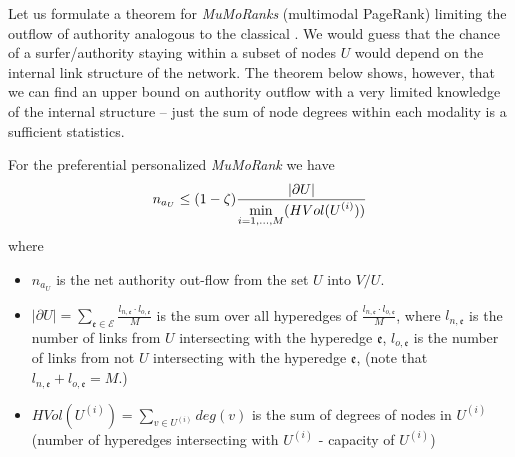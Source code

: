 \documentclass{fundam}
\newcommand{\HEM}{\mathcal{E}}
\newcommand{\hem}{\mathfrak{e}}
\newcommand{\N}{ V }
\begin{document}
Let us formulate a theorem for \emph{MuMoRanks} (multimodal  PageRank) limiting the outflow of authority analogous to the classical
\cite[Theorem 2]{Bipartite:2016}.
We would guess that the chance of a surfer/authority staying within a subset of nodes $U$ would depend on the internal link structure of the network. The theorem below shows, however, that we can find an upper bound on authority outflow with a very limited knowledge of the internal structure -- just the sum of node degrees within each modality is a sufficient statistics.

\begin{theorem} \label{thMPRlimit}
For the preferential personalized \emph{MuMoRank}  we have
$$
n_{a_U}
\le (1-\zeta ) \frac{|\partial{U}|} {\displaystyle \min_{i=1,\dots ,M}(HVol(U^{(i)}))} \vspace*{-2mm}$$
where
\begin{itemize}
\itemsep=0.95pt
\item $n_{a_U}$ is the net authority out-flow from the  set $U$ into $\N / U$.
\item $|\partial {U} |=\sum_{\hem \in \HEM}\frac{l_{n,\hem} \cdot  l_{o,\hem}}{M}$ is the
sum over all hyperedges of $\frac{l_{n,\hem} \cdot  l_{o,\hem}}{M}$,
where $l_{n,\hem}$ is the number of links from $U$ intersecting with the hyperedge $\hem$,
 $l_{o,\hem}$ is the number of links from not $U$ intersecting with the hyperedge $\hem$, (note that $l_{n,\hem}+l_{o,\hem}=M$.)
\item  $HVol(U^{(i)}) =\sum_{v\in U^{(i)}} deg(v)$ is the sum of  degrees of nodes in  $U^{(i)}$ (number of   hyperedges intersecting with  $U^{(i)}$ -  capacity of $U^{(i)}$) \QED
\end{itemize}
\end{theorem}
\end{document}
